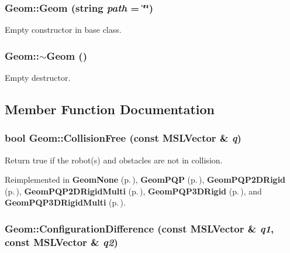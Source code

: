 \subsubsection{\setlength{\rightskip}{0pt plus 5cm}Geom::Geom (string {\em path} = \char`\"{}\char`\"{})}\label{classGeom_a0}


Empty constructor in base class.

\subsubsection{\setlength{\rightskip}{0pt plus 5cm}Geom::$\sim$Geom ()\hspace{0.3cm}{\tt  [inline, virtual]}}\label{classGeom_a1}


Empty destructor.



\subsection{Member Function Documentation}
\subsubsection{\setlength{\rightskip}{0pt plus 5cm}bool Geom::Collision\-Free (const {\bf MSLVector} \& {\em q})\hspace{0.3cm}{\tt  [pure virtual]}}\label{classGeom_a2}


Return true if the robot(s) and obstacles are not in collision.



Reimplemented in {\bf Geom\-None} {\rm (p.\,\pageref{classGeomNone_a2})}, {\bf Geom\-PQP} {\rm (p.\,\pageref{classGeomPQP_a4})}, {\bf Geom\-PQP2DRigid} {\rm (p.\,\pageref{classGeomPQP2DRigid_a2})}, {\bf Geom\-PQP2DRigid\-Multi} {\rm (p.\,\pageref{classGeomPQP2DRigidMulti_a2})}, {\bf Geom\-PQP3DRigid} {\rm (p.\,\pageref{classGeomPQP3DRigid_a2})}, and {\bf Geom\-PQP3DRigid\-Multi} {\rm (p.\,\pageref{classGeomPQP3DRigidMulti_a2})}.
\subsubsection{ Geom::Configuration\-Difference (const {\bf MSLVector} \& {\em q1}, const {\bf MSLVector} \& {\em q2})\hspace{0.3cm}{\tt  [virtual]}}\label{classGeom_a4}


